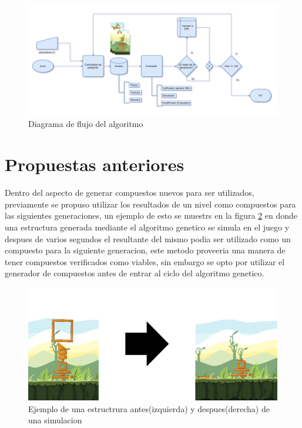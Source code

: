 \begin{figure}
  \centering
  \includegraphics[width=1.0\textwidth]{img/system_model.png}
  \caption{Diagrama de flujo del algoritmo}
  \label{figure:algorithm_model}
\end{figure}

\section{Propuestas anteriores}
\label{section:previous-proposed-methods}

Dentro del aspecto de generar compuestos nuevos para ser utilizados, previamente
se propuso utilizar los resultados de un nivel como compuestos para las
siguientes generaciones, un ejemplo de esto se muestrs en la figura
\ref{figure:prev_composite_proposal_bef_aft} en donde una estructura generada
mediante el algoritmo genetico se simula en el juego y despues de varios
segundos el resultante del mismo podia ser utilizado como un compuesto para la
siguiente generacion, este metodo proveeria una manera de tener compuestos
verificados como viables, sin embargo se opto por utilizar el generador de
compuestos antes de entrar al ciclo del algoritmo genetico.

\begin{figure}
  \centering
  \includegraphics[width=1.0\textwidth]{img/simulation_bef_aft_example.png}
  \caption{Ejemplo de una estructrura antes(izquierda) y despues(derecha) de una simulacion}
  \label{figure:prev_composite_proposal_bef_aft}
\end{figure}

